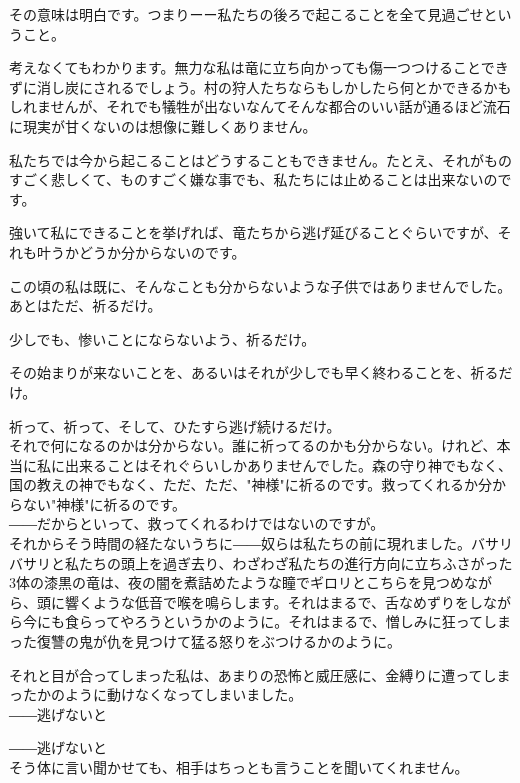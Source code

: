 \documentclass[oneside, a4paper]{jsbook}
\begin{document}
その意味は明白です。つまりーー私たちの後ろで起こることを全て見過ごせということ。

考えなくてもわかります。無力な私は竜に立ち向かっても傷一つつけることできずに消し炭にされるでしょう。村の狩人たちならもしかしたら何とかできるかもしれませんが、それでも犠牲が出ないなんてそんな都合のいい話が通るほど流石に現実が甘くないのは想像に難しくありません。

私たちでは今から起こることはどうすることもできません。たとえ、それがものすごく悲しくて、ものすごく嫌な事でも、私たちには止めることは出来ないのです。

強いて私にできることを挙げれば、竜たちから逃げ延びることぐらいですが、それも叶うかどうか分からないのです。

この頃の私は既に、そんなことも分からないような子供ではありませんでした。\\

あとはただ、祈るだけ。

少しでも、惨いことにならないよう、祈るだけ。

その始まりが来ないことを、あるいはそれが少しでも早く終わることを、祈るだけ。

祈って、祈って、そして、ひたすら逃げ続けるだけ。\\

それで何になるのかは分からない。誰に祈ってるのかも分からない。けれど、本当に私に出来ることはそれぐらいしかありませんでした。森の守り神でもなく、国の教えの神でもなく、ただ、ただ、"神様"に祈るのです。救ってくれるか分からない"神様"に祈るのです。\\

――だからといって、救ってくれるわけではないのですが。\\

それからそう時間の経たないうちに――奴らは私たちの前に現れました。バサリバサリと私たちの頭上を過ぎ去り、わざわざ私たちの進行方向に立ちふさがった3体の漆黒の竜は、夜の闇を煮詰めたような瞳でギロリとこちらを見つめながら、頭に響くような低音で喉を鳴らします。それはまるで、舌なめずりをしながら今にも食らってやろうというかのように。それはまるで、憎しみに狂ってしまった復讐の鬼が仇を見つけて猛る怒りをぶつけるかのように。

それと目が合ってしまった私は、あまりの恐怖と威圧感に、金縛りに遭ってしまったかのように動けなくなってしまいました。\\

――逃げないと

――逃げないと\\

そう体に言い聞かせても、相手はちっとも言うことを聞いてくれません。\\
\end{document}
